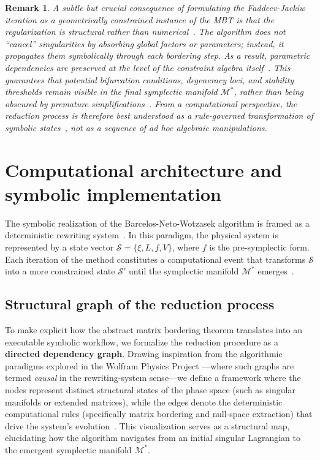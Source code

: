 \documentclass[11pt,a4paper]{article}
\newtheorem{remark}{Remark}
\begin{document}
	\begin{remark}
		A subtle but crucial consequence of formulating the Faddeev-Jackiw iteration as a geometrically constrained instance of the MBT is that the regularization is structural rather than numerical~\cite{Kuznetsov2004,Seydel2010}. The algorithm does not ``cancel'' singularities by absorbing global factors or parameters; instead, it propagates them symbolically through each bordering step. As a result, parametric dependencies are preserved at the level of the constraint algebra itself~\cite{Henneaux1992,Rothe1997}. This guarantees that {potential} bifurcation conditions, degeneracy loci, and stability thresholds remain visible in the final symplectic manifold $\mathcal{M}^*$, rather than being obscured by premature simplifications~\cite{Kuznetsov2004,Guckenheimer1983}. From a computational perspective, the reduction process is therefore best understood as a rule-governed transformation of symbolic states~\cite{Wolfram2002,Gorard2024}, not as a sequence of ad hoc algebraic manipulations.
	\end{remark}
	
	
	
	\section{Computational architecture and symbolic implementation}\label{sec3}
	
	
	The symbolic realization of the Barcelos-Neto-Wotzasek algorithm is framed as a deterministic rewriting system~\cite{Wolfram2002,WolframPhysics2020}. In this paradigm, the physical system is represented by a state vector $\mathcal{S} = \{ \xi, L, f, V \}$, where $f$ is the pre-symplectic form. Each iteration of the method constitutes a computational event that transforms $\mathcal{S}$ into a more constrained state $\mathcal{S}'$ until the symplectic manifold $\mathcal{M}^*$ emerges~\cite{Gorard2024,FaddeevJackiw1988}.
	
	
	\subsection{Structural graph of the reduction process}
	
	
	To make explicit how the abstract matrix bordering theorem translates into an executable symbolic workflow, we formalize the reduction procedure as a \textbf{directed dependency graph}. Drawing inspiration from the algorithmic paradigms explored in the Wolfram Physics Project \cite{Gorard2024,WolframPhysics2020}---where such graphs are termed \emph{causal} in the rewriting-system sense---we define a framework where the nodes represent distinct structural states of the phase space (such as singular manifolds or extended matrices), while the edges denote the deterministic computational rules (specifically matrix bordering and null-space extraction) that drive the system's evolution~\cite{Wolfram2002}. This visualization serves as a structural map, elucidating how the algorithm navigates from an initial singular Lagrangian to the emergent symplectic manifold $\mathcal{M}^*$.
	
\end{document}
